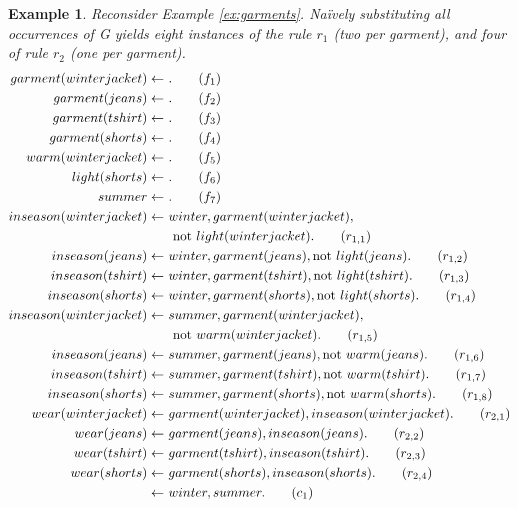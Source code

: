 \documentclass{vutinfth} %
\newtheorem{example}{Example}[section]
\newcommand{\fail}{\mathrm{not } \ \xspace}
\newcommand{\from}{\ensuremath{\leftarrow}}
\begin{document}
\begin{example}
\label{ex:garmentsground}
Reconsider Example \ref{ex:garments}. Na{\"i}vely substituting all occurrences of \emph{G} yields eight instances of the rule $r_1$ (two per garment), and four of rule $r_2$ (one per garment).
\begin{align}
garment(winterjacket)\from& \ . \tag{$f_1$}\label{ex:garmentsground:garments:begin}\\
garment(jeans)\from& \ .\tag{$f_2$}\\
garment(tshirt)\from& \ .\tag{$f_3$}\\
garment(shorts)\from& \ .\tag{$f_4$}\label{ex:garmentsground:garments:end}\\
warm(winterjacket)\from& \ .\tag{$f_5$}\label{ex:garmentsground:style:begin}\\
light(shorts)\from& \ .\tag{$f_6$}\label{ex:garmentsground:style:end}\\
summer\from& \ .\tag{$f_7$}\label{ex:garmentsground:season}\\
inseason(winterjacket) \from& \ winter, garment(winterjacket), \notag\\
& \ \ \fail light(winterjacket). \tag{$r_{1,1}$}\label{ex:garmentsground:inseason:begin}\\
inseason(jeans) \from& \ winter, garment(jeans), \fail light(jeans).\tag{$r_{1,2}$}\\
inseason(tshirt) \from& \ winter, garment(tshirt), \fail light(tshirt).\tag{$r_{1,3}$}\\
inseason(shorts) \from& \ winter, garment(shorts), \fail light(shorts).\tag{$r_{1,4}$}\\
inseason(winterjacket) \from& \ summer, garment(winterjacket), \notag\\
& \ \ \fail warm(winterjacket).\tag{$r_{1,5}$}\\
inseason(jeans) \from& \ summer, garment(jeans), \fail warm(jeans).\tag{$r_{1,6}$}\\
inseason(tshirt) \from& \ summer, garment(tshirt), \fail warm(tshirt).\tag{$r_{1,7}$}\\
inseason(shorts) \from& \ summer, garment(shorts), \fail warm(shorts). \tag{$r_{1,8}$}\label{ex:garmentsground:inseason:end}\\
wear(winterjacket) \from& \ garment(winterjacket), inseason(winterjacket).\tag{$r_{2,1}$}\\
wear(jeans) \from& \ garment(jeans), inseason(jeans).\tag{$r_{2,2}$}\\
wear(tshirt) \from& \ garment(tshirt), inseason(tshirt).\tag{$r_{2,3}$}\\
wear(shorts) \from& \ garment(shorts), inseason(shorts).\tag{$r_{2,4}$}\\
\from& \ winter, summer.\tag{$c_1$} \label{ex:garmentsground:seasons}
\end{align}
\end{example}
\end{document}
